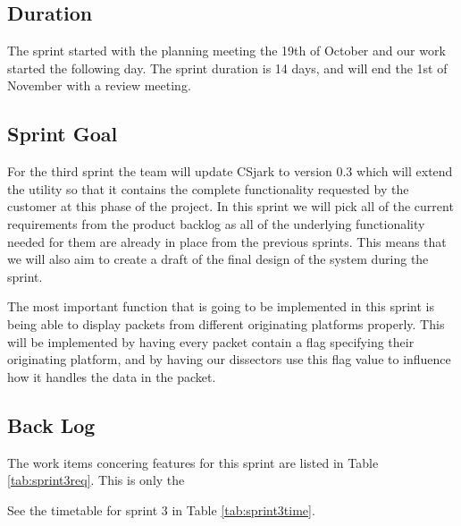 \subsection{Duration}

The sprint started with the planning meeting the 19th of October and our work started the following day. The sprint duration is 14 days, and will end the 1st of November with a review meeting. 


\subsection{Sprint Goal}
For the third sprint the team will update CSjark to version 0.3 which will extend the utility so that it contains the complete functionality requested by the customer at this phase of the project. In this sprint we will pick all of the current requirements from the product backlog as all of the underlying functionality needed for them are already in place from the previous sprints. This means that we will also aim to create a draft of the final design of the system during the sprint.

The most important function that is going to be implemented in this sprint is being able to display packets from different originating platforms properly. This will be implemented by having every packet contain a flag specifying their originating platform, and by having our dissectors use this flag value to influence how it handles the data in the packet.

\subsection{Back Log}
The work items concering features for this sprint are listed in Table \ref{tab:sprint3req}. This is only the 

See the timetable for sprint 3 in Table \ref{tab:sprint3time}.

